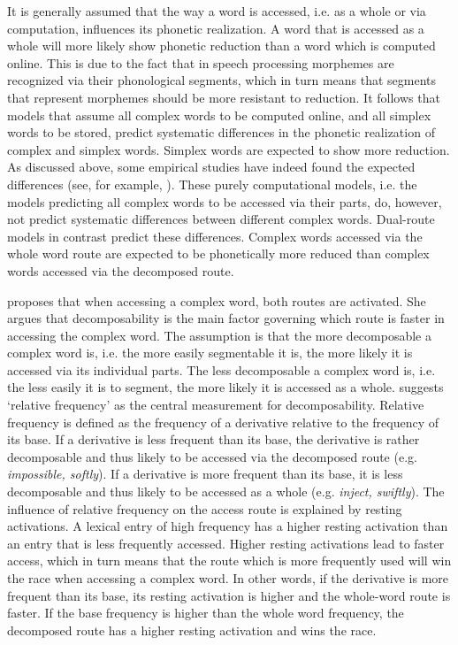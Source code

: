 It is generally assumed that the way a word is accessed, i.e. as a whole or via computation, influences its phonetic realization. A word that is accessed as a whole will more likely show phonetic reduction than a word which is computed online.  This is due to the fact that in speech processing morphemes are recognized via their phonological segments, which in turn means that segments that represent morphemes should be more resistant to reduction. It follows that models that assume all complex words to be computed online, and all simplex words to be stored, predict systematic differences in the phonetic realization of complex and simplex words. Simplex words are expected to show more reduction. As discussed above, some empirical studies have indeed found the expected differences (see, for example, \citealt{Cho.2001,Sugahara.2009,Smith.2012}).
These purely computational models, i.e. the models predicting all complex words to be accessed via their parts,  do, however, not predict systematic differences between different complex words. Dual-route models in contrast predict these differences. Complex words accessed via the whole word route  are expected to be phonetically more reduced than complex words accessed via the decomposed route.



\cite{Hay.2001,Hay.2003} proposes that when accessing a complex word, both routes are activated. She argues that decomposability is the main factor governing  which route is faster in accessing the complex word. The assumption is that the more decomposable a complex word is, i.e. the more easily segmentable it is, the more likely it is accessed via its individual parts. The less decomposable a complex word is, i.e.  the less easily it is to segment, the more likely it is accessed as a whole. \cite{Hay.2001,Hay.2003} suggests `relative frequency' as the central measurement for decomposability. Relative frequency is defined as the frequency of a derivative relative to the frequency of its base. If a derivative is less frequent than its base, the derivative is rather decomposable and thus likely to be accessed via the decomposed route (e.g. \textit{impossible, softly}).  If a derivative is more frequent than its base, it is less decomposable and thus likely to be accessed as a whole (e.g. \textit{inject, swiftly}). 
The influence of relative frequency on the access route is explained by resting activations. A lexical entry of high frequency has a higher resting activation than an entry that is less frequently accessed. Higher resting activations lead to faster access, which in turn means that the route which is more frequently used will win the race when accessing a complex word. In other words, if the derivative is more frequent than its base, its resting activation is higher and the whole-word route is faster. If the base frequency is higher than the whole word frequency, the decomposed route has a higher resting activation and wins the race.


